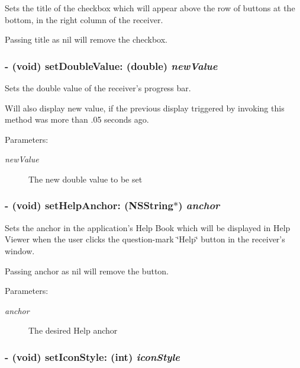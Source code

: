 Sets the title of the checkbox which will appear above the row of buttons at the bottom, in the right column of the receiver. 

Passing title as nil will remove the checkbox. \hypertarget{interface_s_s_y_alert_afae30a5f44eb75295549e0330cce30b}{
\subsubsection[{setDoubleValue:}]{\setlength{\rightskip}{0pt plus 5cm}- (void) setDoubleValue: (double) {\em newValue}}}
\label{interface_s_s_y_alert_afae30a5f44eb75295549e0330cce30b}


Sets the double value of the receiver's progress bar. 

Will also display new value, if the previous display triggered by invoking this method was more than .05 seconds ago.

\begin{Desc}
\item[Parameters:]
\begin{description}
\item[{\em newValue}]The new double value to be set \end{description}
\end{Desc}
\hypertarget{interface_s_s_y_alert_13b93cc5e7a16913f29ce3da427509d1}{
\subsubsection[{setHelpAnchor:}]{\setlength{\rightskip}{0pt plus 5cm}- (void) setHelpAnchor: (NSString$\ast$) {\em anchor}}}
\label{interface_s_s_y_alert_13b93cc5e7a16913f29ce3da427509d1}


Sets the anchor in the application's Help Book which will be displayed in Help Viewer when the user clicks the question-mark \char`\"{}Help\char`\"{} button in the receiver's window. 

Passing anchor as nil will remove the button. \begin{Desc}
\item[Parameters:]
\begin{description}
\item[{\em anchor}]The desired Help anchor \end{description}
\end{Desc}
\hypertarget{interface_s_s_y_alert_ecb6c9cfdff8c675ad91af57ffbc0fdf}{
\subsubsection[{setIconStyle:}]{\setlength{\rightskip}{0pt plus 5cm}- (void) setIconStyle: (int) {\em iconStyle}}}
\label{interface_s_s_y_alert_ecb6c9cfdff8c675ad91af57ffbc0fdf}


